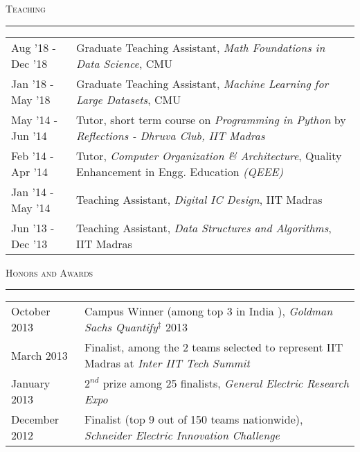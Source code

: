 \documentclass[8pt,a4paper,English]{article}
\newcommand{\lv}{\color{table-border}\vrule}
\newcommand\roottitle[1]{ \vspace{3mm} \noindent \textsc{ \normalsize #1} \vspace{1.5mm} \nopagebreak[4] \color{gray} \hrule \color{black} \vspace{2mm} \noindent \small }
\begin{document}
{%

\roottitle{Teaching}
\renewcommand{\arraystretch}{1.2}
\setlength\tabcolsep{8pt}
\begin{tabularx}{\textwidth}{ R{2.6cm} !{\lv} X }
  Aug '18 - Dec '18 & Graduate Teaching Assistant, \textit{Math Foundations in Data Science}, CMU \\
  Jan '18 - May '18 & Graduate Teaching Assistant, \textit{Machine Learning for Large Datasets}, CMU \\
  May '14 - Jun '14 & Tutor, short term course on \textit{ Programming in Python} by \textit{Reflections - Dhruva Club, IIT Madras}\\
  Feb '14 - Apr '14 & Tutor, \textit{Computer Organization \& Architecture}, Quality Enhancement in Engg. Education \textit{(QEEE)} \\
  Jan '14 - May '14 & Teaching Assistant, \textit{Digital IC Design}, IIT Madras \\
  Jun '13 - Dec '13 & Teaching Assistant, \textit{Data Structures and Algorithms}, IIT Madras \\
\end{tabularx}


\roottitle{Honors and Awards}
\renewcommand{\arraystretch}{1.2}
\setlength\tabcolsep{8pt}
\begin{tabularx}{\textwidth}{ R{2.6cm} !{\lv} X }
    October 2013    & Campus Winner (among top {3} in India ), \textit{Goldman Sachs Quantify}$^\ddag$ 2013 \\ %
	March 2013		& Finalist, among the 2 teams selected to represent IIT Madras at \textit{Inter IIT Tech Summit} \\
    January 2013    & $2^{nd}$ prize among 25 finalists, \textit{General Electric Research Expo} \\ 
    December 2012   & Finalist (top 9 out of 150 teams nationwide), \textit{Schneider Electric Innovation Challenge} \\
\end{tabularx}

}
\end{document}
